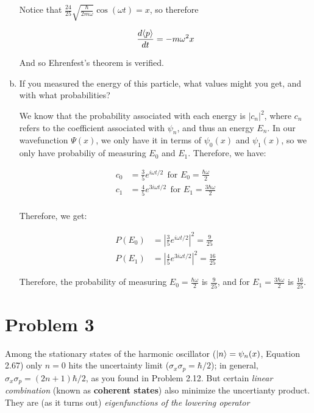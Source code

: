 \documentclass[10pt]{article}
\begin{document}
\begin{enumerate}[(a)]
\begin{solution}
            Notice that $\frac{24}{25} \sqrt{\frac{\hbar}{2m\omega}} \cos(\omega t) = x$, so therefore 

            \[ \frac{d\langle p \rangle}{dt} = -m\omega^2 x\] 

            And so Ehrenfest's theorem is verified. 
        \end{solution}
        \item If you measured the energy of this particle, what values might you get, and with what probabilities? 
        
        \begin{solution}
            We know that the probability associated with each energy is $|c_n|^2$, where $c_n$ refers to the coefficient associated with $\psi_n$, and thus an energy $E_n$. In our wavefunction $\Psi(x)$, we only have it in terms of $\psi_0(x)$ and $\psi_1(x)$, so we only have probabiliy of measuring $E_0$ and $E_1$. Therefore, we have:

            \begin{align*}
                c_0 &= \frac{3}{5} e^{i\omega t/2} \ \ \text{for } E_0 = \frac{\hbar \omega}{2}\\
                c_1 &= \frac{4}{5} e^{3i\omega t/2} \ \ \text{for } E_1 = \frac{3\hbar \omega}{2}\\
            \end{align*}

            Therefore, we get: 

            \begin{align*}
                P(E_0) &= \left| \frac 35 e^{i\omega t/2}\right|^2 = \frac{9}{25}\\
                P(E_1) &= \left| \frac 45 e^{3i\omega t/2}\right|^2 = \frac{16}{25}
            \end{align*}

            Therefore, the probability of measuring $E_0 = \frac{\hbar \omega}{2}$ is $\frac{9}{25}$, and for $E_1 = \frac{3\hbar \omega}{2}$ is $\frac{16}{25}$. 
        \end{solution}
    \end{enumerate}

    \pagebreak

    \section*{Problem 3}

    Among the stationary states of the harmonic oscillator ($\ket n = \psi_n(x)$, Equation 2.67) only $n = 0$ hits the uncertainty limit ($\sigma_x \sigma_p = \hbar/2$); in general, $\sigma_x\sigma_p = (2n +1)\hbar/2$, as you found in Problem 2.12. But certain \textit{linear combination} (known as \textbf{coherent states}) also minimize the uncertianty product. They are (as it turns out) \textit{eigenfunctions of the lowering operator}
\end{document}
